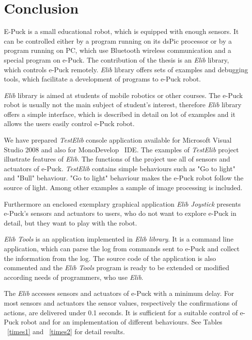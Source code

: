 \chapter{Conclusion} \label{chap:conclusion}
	E-Puck is a small educational robot, which is equipped with enough sensors. It can be controlled either
	by a program running on its dsPic processor or by a program running on PC, 
	which use Bluetooth wireless communication and 
	a special program on e-Puck.
	The contribution of the thesis is an {\it Elib} library, which controls e-Puck remotely.
	{\it Elib} library offers sets of examples and debugging tools, which facilitate a development 
	of programs to e-Puck robot.

	{\it Elib} library is aimed at students of mobile robotics or other courses.
	The e-Puck robot is usually not the main subject of student's interest, therefore
	{\it Elib} library offers a simple interface, which is described in detail on lot of examples and 
	it allows the users easily control e-Puck robot.

	We have prepared {\it TestElib} console application available for Microsoft Visual Studio 2008 \cite{msvs} and also
	for MonoDevelop~\cite{monodev} IDE. The examples of {\it TestElib} project illustrate features of {\it Elib}.
	The functions of the project use all of sensors and actuators of e-Puck.
	{\it TestElib} contains simple behaviours such as "Go to light" and "Bull" behaviour. "Go to light" behaviour
	makes the e-Puck robot follow the source of light.
	Among other examples a sample of image processing is included.

	Furthermore an enclosed exemplary graphical application {\it Elib Joystick}  presents e-Puck's sensors and actuators
	to users, who do not want to explore e-Puck in detail, but they want to play with the robot.

	{\it Elib Tools} is an application implemented in {\it Elib library}. It is a command line application, 
	which can parse the log from commands sent to e-Puck and collect the information from the log.
	The source code of the application is also commented and the {\it Elib Tools} program is  ready to be extended 
	or modified according needs of programmers, who use {\it Elib}.

	The {\it Elib} accesses sensors and actuators of e-Puck with a minimum delay. 
	For most sensors and actuators the sensor values, respectively the confirmations of actions,
	are delivered under 0.1 seconds. 
	It is sufficient for a suitable control of e-Puck robot and for an implementation of different behaviours.
	See Tables ~\ref{times1} and ~\ref{times2} for detail results.

